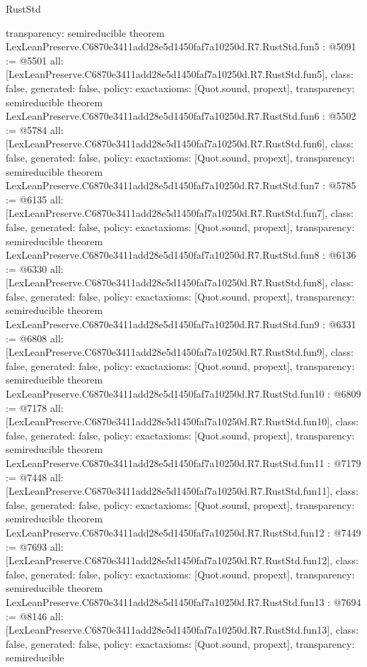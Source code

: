 \begin{lexlean}{RustStd}
\begin{coremodule}
{  transparency: semireducible
}
theorem LexLeanPreserve.C6870e3411add28e5d1450faf7a10250d.R7.RustStd.fun5 : @5091 := @5501 {
  all: [LexLeanPreserve.C6870e3411add28e5d1450faf7a10250d.R7.RustStd.fun5],
  class: false,
  generated: false,
  policy: exact{axioms: [Quot.sound, propext]},
  transparency: semireducible
}
theorem LexLeanPreserve.C6870e3411add28e5d1450faf7a10250d.R7.RustStd.fun6 : @5502 := @5784 {
  all: [LexLeanPreserve.C6870e3411add28e5d1450faf7a10250d.R7.RustStd.fun6],
  class: false,
  generated: false,
  policy: exact{axioms: [Quot.sound, propext]},
  transparency: semireducible
}
theorem LexLeanPreserve.C6870e3411add28e5d1450faf7a10250d.R7.RustStd.fun7 : @5785 := @6135 {
  all: [LexLeanPreserve.C6870e3411add28e5d1450faf7a10250d.R7.RustStd.fun7],
  class: false,
  generated: false,
  policy: exact{axioms: [Quot.sound, propext]},
  transparency: semireducible
}
theorem LexLeanPreserve.C6870e3411add28e5d1450faf7a10250d.R7.RustStd.fun8 : @6136 := @6330 {
  all: [LexLeanPreserve.C6870e3411add28e5d1450faf7a10250d.R7.RustStd.fun8],
  class: false,
  generated: false,
  policy: exact{axioms: [Quot.sound, propext]},
  transparency: semireducible
}
theorem LexLeanPreserve.C6870e3411add28e5d1450faf7a10250d.R7.RustStd.fun9 : @6331 := @6808 {
  all: [LexLeanPreserve.C6870e3411add28e5d1450faf7a10250d.R7.RustStd.fun9],
  class: false,
  generated: false,
  policy: exact{axioms: [Quot.sound, propext]},
  transparency: semireducible
}
theorem LexLeanPreserve.C6870e3411add28e5d1450faf7a10250d.R7.RustStd.fun10 : @6809 := @7178 {
  all: [LexLeanPreserve.C6870e3411add28e5d1450faf7a10250d.R7.RustStd.fun10],
  class: false,
  generated: false,
  policy: exact{axioms: [Quot.sound, propext]},
  transparency: semireducible
}
theorem LexLeanPreserve.C6870e3411add28e5d1450faf7a10250d.R7.RustStd.fun11 : @7179 := @7448 {
  all: [LexLeanPreserve.C6870e3411add28e5d1450faf7a10250d.R7.RustStd.fun11],
  class: false,
  generated: false,
  policy: exact{axioms: [Quot.sound, propext]},
  transparency: semireducible
}
theorem LexLeanPreserve.C6870e3411add28e5d1450faf7a10250d.R7.RustStd.fun12 : @7449 := @7693 {
  all: [LexLeanPreserve.C6870e3411add28e5d1450faf7a10250d.R7.RustStd.fun12],
  class: false,
  generated: false,
  policy: exact{axioms: [Quot.sound, propext]},
  transparency: semireducible
}
theorem LexLeanPreserve.C6870e3411add28e5d1450faf7a10250d.R7.RustStd.fun13 : @7694 := @8146 {
  all: [LexLeanPreserve.C6870e3411add28e5d1450faf7a10250d.R7.RustStd.fun13],
  class: false,
  generated: false,
  policy: exact{axioms: [Quot.sound, propext]},
  transparency: semireducible
}
\end{coremodule}
\end{lexlean}
